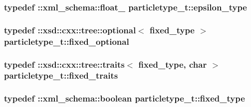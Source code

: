 \subsubsection[{\texorpdfstring{epsilon\+\_\+type}{epsilon_type}}]{\setlength{\rightskip}{0pt plus 5cm}typedef \+::{\bf xml\+\_\+schema\+::float\+\_\+} {\bf particletype\+\_\+t\+::epsilon\+\_\+type}}\hypertarget{classparticletype__t_a94692265645066b820b0e4c308c1566f}{}\label{classparticletype__t_a94692265645066b820b0e4c308c1566f}
\subsubsection[{\texorpdfstring{fixed\+\_\+optional}{fixed_optional}}]{\setlength{\rightskip}{0pt plus 5cm}typedef \+::xsd\+::cxx\+::tree\+::optional$<$ {\bf fixed\+\_\+type} $>$ {\bf particletype\+\_\+t\+::fixed\+\_\+optional}}\hypertarget{classparticletype__t_a42eca3b383084472937b0ad4f370bbb2}{}\label{classparticletype__t_a42eca3b383084472937b0ad4f370bbb2}
\subsubsection[{\texorpdfstring{fixed\+\_\+traits}{fixed_traits}}]{\setlength{\rightskip}{0pt plus 5cm}typedef \+::xsd\+::cxx\+::tree\+::traits$<$ {\bf fixed\+\_\+type}, char $>$ {\bf particletype\+\_\+t\+::fixed\+\_\+traits}}\hypertarget{classparticletype__t_ae90f4fb144ba140e553d5aaeca48ebb5}{}\label{classparticletype__t_ae90f4fb144ba140e553d5aaeca48ebb5}
\subsubsection[{\texorpdfstring{fixed\+\_\+type}{fixed_type}}]{\setlength{\rightskip}{0pt plus 5cm}typedef \+::{\bf xml\+\_\+schema\+::boolean} {\bf particletype\+\_\+t\+::fixed\+\_\+type}}\hypertarget{classparticletype__t_a689bb940332f300e99acdf3d50ffdc2c}{}\label{classparticletype__t_a689bb940332f300e99acdf3d50ffdc2c}
